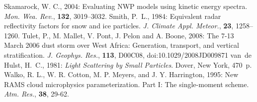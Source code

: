 \decrefname
Skamarock, W. C., 2004: Evaluating NWP models using kinetic energy spectra.
  {\em Mon. Wea. Rev.}, {\bf 132}, 3019--3032.
\decrefname
Smith, P.~L., 1984: Equivalent radar reflectivity factors for snow and ice
  particles. {\em J. Climate Appl. Meteor.}, {\bf 23}, 1258--1260.
\decrefname
Tulet, P., M. Mallet, V. Pont, J. Pelon and A. Boone, 2008: The 7-13 March 2006 dust
  storm over West Africa: Generation, transport, and vertical stratification.
  {\it J. Geophys. Res.}, {\bf 113}, D00C08, doi:10.1029/2008JD009871
\decrefname
van~de Hulst, H.~C., 1981: {\em Light Scattering by Small Particles}. Dover,
  New York, 470~p.
\decrefname
Walko, R. L., W. R. Cotton, M. P. Meyers, and J. Y. Harrington, 1995:
      New RAMS cloud microphysics parameterization. Part I: The single-moment
      scheme.
      {\it Atm. Res.},
      {\bf 38},
      29-62.
\decrefname


